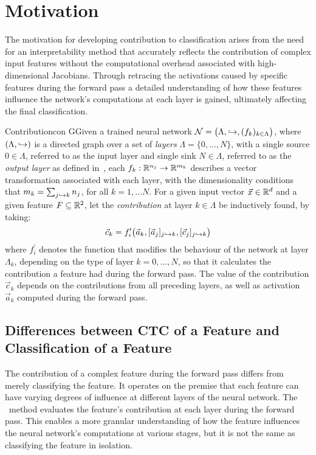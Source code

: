 \section{Motivation}

The motivation for developing contribution to classification arises from the need for an interpretability method that accurately reflects the contribution of complex input features without the computational overhead associated with high-dimensional Jacobians. Through retracing the activations caused by specific features during the forward pass a detailed understanding of how these features influence the network's computations at each layer is gained, ultimately affecting the final classification. 

\begin{Definition}{Contribution}{con}
GGiven a trained neural network $\mathcal{N}=\big(\Lambda,\hookrightarrow,(f_k)_{k\in \Lambda}\big)$, where $(\Lambda,\hookrightarrow)$ is a directed graph over a set of \emph{layers} $\Lambda=\{0,\dots, N\}$, with a single source $0\in \Lambda$, referred to as the input layer and single sink $N\in \Lambda$, referred to as the \emph{output layer} as defined in~, each $f_k:\mathbb{R}^{n_j}\to \mathbb{R}^{m_k}$ describes a vector transformation associated with each layer, with the dimensionality conditions that $m_k=\sum_{j\hookrightarrow k} n_j$, for all $k=1,\dots N$. For a given input vector $\vec{x}\in \mathbb{R}^d$ and a given feature $F\subseteq \mathbb{R}^2$, let the \emph{contribution} at layer $k\in \Lambda$ be inductively found, by taking:
\begin{equation*}
       \vec{c}_k = f_i^\prime\big(\vec{a}_k,[\vec{a}_j]_{j\hookrightarrow k},[\vec{c}_j]_{j\hookrightarrow k}\big)
\end{equation*}
where $f_i^\prime$ denotes the function that modifies the behaviour of the network at layer $\Lambda_k$, depending on the type of layer $k=0,\dots, N$, so that it calculates the contribution a feature had during the forward pass. The value of the contribution $\vec{c}_k$ depends on the contributions from all preceding layers, as well as activation $\vec{a}_k$ computed during the forward pass.
\end{Definition}

\subsection{Differences between CTC of a Feature and Classification of a Feature}

The contribution of a complex feature during the forward pass differs from merely classifying the feature. It operates on the premise that each feature can have varying degrees of influence at different layers of the neural network. The \CTC\ method evaluates the feature's contribution at each layer during the forward pass. This enables a more granular understanding of how the feature influences the neural network's computations at various stages, but it is not the same as classifying the feature in isolation.

